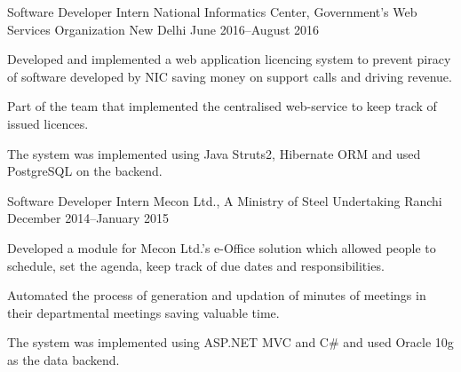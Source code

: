 
\begin{cventries}

\cventry%
  {Software Developer Intern} %
  {National Informatics Center, Government's Web Services Organization} %
  {New Delhi} %
  {June 2016--August 2016} %
  {%
    \begin{cvitems} %
      \item{Developed and implemented a web application licencing system to
            prevent piracy of software developed by NIC saving money on support
            calls and driving revenue.}
      \item{Part of the team that implemented the centralised web-service to
            keep track of issued licences.}
      \item{The system was implemented using Java Struts2, Hibernate ORM and
            used PostgreSQL on the backend.}
    \end{cvitems}
  }

\cventry%
  {Software Developer Intern} %
  {Mecon Ltd., A Ministry of Steel Undertaking} %
  {Ranchi} %
  {December 2014--January 2015} %
  {%
    \begin{cvitems} %
      \item{Developed a module for Mecon Ltd.'s e-Office solution which allowed
            people to schedule, set the agenda, keep track of due dates and
            responsibilities.}
      \item{Automated the process of generation and updation of minutes of
            meetings in their departmental meetings saving valuable time.}
      \item{The system was implemented using ASP.NET MVC and C\# and used
            Oracle 10g as the data backend.}
    \end{cvitems}
  }

\end{cventries}
